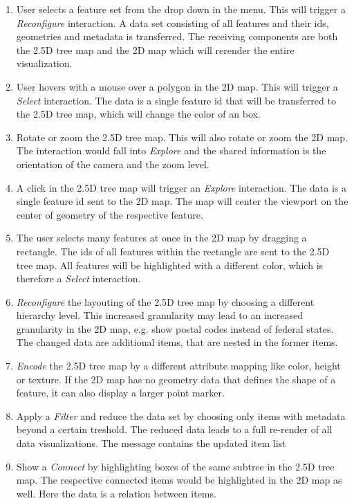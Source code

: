 \documentclass{article}
\newcommand{\map}{\textsc{2D} map}
\newcommand{\tmap}{\textsc{2.5D} tree map}
\begin{document}
    \begin{enumerate}
      \item
        User selects a feature set from the drop down in the menu. This will trigger a \emph{Reconfigure} interaction. A data set consisting of all features and their ids, geometries and metadata is transferred. The receiving components are both the \tmap{} and the \map{} which will rerender the entire visualization.
      \item
        User hovers with a mouse over a polygon in the \map{}. This will trigger a \emph{Select} interaction. The data is a single feature id that will be transferred to the \tmap{}, which will change the color of an box.
      \item
        Rotate or zoom the \tmap{}. This will also rotate or zoom the \map{}. The interaction would fall into \emph{Explore} and the shared information is the orientation of the camera and the zoom level.
      \item
        A click in the \tmap{} will trigger an \emph{Explore} interaction. The data is a single feature id sent to the \map{}. The map will center the viewport on the center of geometry of the respective feature.
      \item
        The user selects many features at once in the \map{} by dragging a rectangle. The ids of all features within the rectangle are sent to the \tmap{}. All features will be highlighted with a different color, which is therefore a \emph{Select} interaction.
      \item
        \emph{Reconfigure} the layouting of the \tmap{} by choosing a different hierarchy level. This increased granularity may lead to an increased granularity in the \map{}, e.g. show postal codes instead of federal states. The changed data are additional items, that are nested in the former items.
      \item
        \emph{Encode} the \tmap{} by a different attribute mapping like color, height or texture. If the \map{} has no geometry data that defines the shape of a feature, it can also display a larger point marker.
      \item
        Apply a \emph{Filter} and reduce the data set by choosing only items with metadata beyond a certain treshold. The reduced data leads to a full re-render of all data visualizations. The message contains the updated item list
  \item
    Show a \emph{Connect} by highlighting boxes of the same subtree in the \tmap{}. The respective connected items would be highlighted in the \map{} as well. Here the data is a relation between items.
    \end{enumerate}
\end{document}
